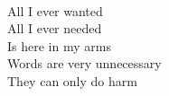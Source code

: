 \\
All I ever wanted \\
All I ever needed \\
Is here in my arms \\
Words are very unnecessary \\
They can only do harm \\
